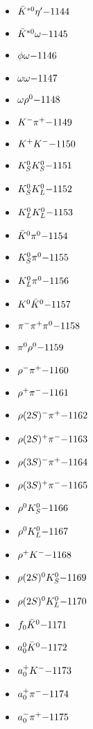 \begin{multicols}{3}
\begin{itemize}
 \item $ \bar{K}^{*0} {\eta^{\prime}} \hfill{-1144}$
 \item $ \bar{K}^{*0} \omega \hfill{-1145}$
 \item $ \phi \omega \hfill{-1146}$
 \item $ \omega \omega \hfill{-1147}$
 \item $ \omega \rho^{0} \hfill{-1148}$
 \item $ K^{-} \pi^{+} \hfill{-1149}$
 \item $ K^{+} K^{-} \hfill{-1150}$
 \item $ K_{S}^{0} K_{S}^{0} \hfill{-1151}$
 \item $ K_{S}^{0} K_{L}^{0} \hfill{-1152}$
 \item $ K_{L}^{0} K_{L}^{0} \hfill{-1153}$
 \item $ \bar{K}^{0} \pi^{0} \hfill{-1154}$
 \item $ K_{S}^{0} \pi^{0} \hfill{-1155}$
 \item $ K_{L}^{0} \pi^{0} \hfill{-1156}$
 \item $ K^{0} \bar{K}^{0} \hfill{-1157}$
 \item $ \pi^{-} \pi^{+} \pi^{0} \hfill{-1158}$
 \item $ \pi^{0} \rho^{0} \hfill{-1159}$
 \item $ \rho^{-} \pi^{+} \hfill{-1160}$
 \item $ \rho^{+} \pi^{-} \hfill{-1161}$
 \item $ \rho(2S)^{-} \pi^{+} \hfill{-1162}$
 \item $ \rho(2S)^{+} \pi^{-} \hfill{-1163}$
 \item $ \rho(3S)^{-} \pi^{+} \hfill{-1164}$
 \item $ \rho(3S)^{+} \pi^{-} \hfill{-1165}$
 \item $ \rho^{0} K_{S}^{0} \hfill{-1166}$
 \item $ \rho^{0} K_{L}^{0} \hfill{-1167}$
 \item $ \rho^{+} K^{-} \hfill{-1168}$
 \item $ \rho(2S)^{0} K_{S}^{0} \hfill{-1169}$
 \item $ \rho(2S)^{0} K_{L}^{0} \hfill{-1170}$
 \item $ f_{0} \bar{K}^{0} \hfill{-1171}$
 \item $ a_{0}^{0} \bar{K}^{0} \hfill{-1172}$
 \item $ a_{0}^{+} K^{-} \hfill{-1173}$
 \item $ a_{0}^{+} \pi^{-} \hfill{-1174}$
 \item $ a_{0}^{-} \pi^{+} \hfill{-1175}$

\end{itemize}
\end{multicols}
